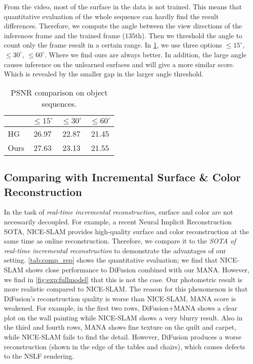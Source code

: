 From the video, most of the surface in the data is not trained. This means that quantitative evaluation of the whole sequence can hardly find the result differences.
Therefore, we compute the angle between the view directions of the inferences frame and the trained frame ($135$th). Then we threshold the angle to count only the frame result in a certain range.
In \cref{tab:chicken}, we use three options $\le 15^{\circ}$, $\le 30^{\circ}$, $\le 60^{\circ}$.
Where we find ours are always better. In addition, the large angle causes inference on the unlearned surfaces and will give a more similar score. Which is revealed by the smaller gap in the larger angle threshold.
\begin{table} [htbp]
	\caption {PSNR comparison on object sequences.}
	\centering
	\begin{tabular}{l|ccc}
		\hline
		& $\le 15^{\circ}$ & $\le 30^{\circ}$& $\le 60^{\circ}$ \\\hline
		HG&26.97&22.87&21.45\\
		Ours&27.63&23.13&21.55\\
		\hline
	\end{tabular}
	\label{tab:chicken}
\end{table}

\subsection{Comparing with Incremental Surface \& Color Reconstruction}
In the task of \emph{real-time incremental reconstruction}, surface and color are not necessarily decoupled.
For example, a recent Neural Implicit Reconstruction SOTA, NICE-SLAM provides high-quality surface and color reconstruction at the same time as online reconstruction. 
%
Therefore, we compare it to the \emph{SOTA of real-time incremental reconstruction} to demonstrate the advantages of our setting.
%
\cref{tab:comp_rep} shows the quantitative evaluation; we find that NICE-SLAM shows close performance to DiFusion combined with our MANA.
%
However, we find in \cref{fig:exp:fullmodel} that this is not the case. 
Our photometric result is more realistic compared to NICE-SLAM. 
The reason for this phenomenon is that DiFusion's reconstruction quality is worse than NICE-SLAM, MANA score is weakened.
For example, in the first two rows, DiFusion+MANA shows a clear plot on the wall painting while NICE-SLAM shows a very blurry result.
Also in the third and fourth rows, MANA shows fine texture on the quilt and carpet, while NICE-SLAM fails to find the detail.
However, DiFusion produces a worse reconstruction (shown in the edge of the tables and chairs), which causes defects to the NSLF rendering.

